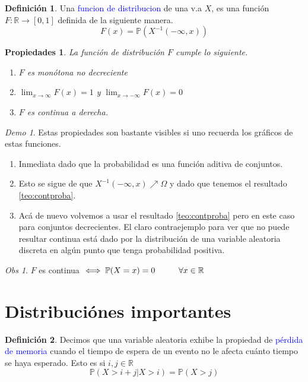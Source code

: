 \documentclass[11pt]{article}
\theoremstyle{plain} %
\newtheorem*{props}{Propiedades}
\theoremstyle{definition}
\newtheorem*{definicion}{Definici\'{o}n} %
\theoremstyle{remark}
\newtheorem{obs}{Obs}
\newtheorem*{demo}{Demo}
\def\Om{\Omega}
\def\R{\mathbb{R}}
\def\P{\mathbb{P}}
\def\va{variable aleatoria }
\def\blue{\textcolor{blue}}
\begin{document}
\begin{definicion}
	Una \blue{funcion de distribucion} de una v.a $X$, es una funci\'on $F:\R \to [0,1]$ definida de la siguiente manera.
	\[F(x) = \P \left( X^{-1}(-\infty,x) \right)\]
\end{definicion}

\begin{props}
	La funci\'on de distribuci\'on $F$ cumple lo siguiente.
	\begin{enumerate}
		\item $F$ es mon\'otona no decreciente 
		\item $\lim_{x \to \infty} F(x) = 1 $ y $\lim_{x \to - \infty} F(x) = 0$
		\item $F$ es continua a derecha.
	\end{enumerate}
\end{props}

\begin{demo}
Estas propiedades son bastante visibles si uno recuerda los gr\'aficos de estas funciones.
	\begin{enumerate}
		\item Inmediata dado que la probabilidad es una funci\'on aditiva de conjuntos.
		\item Esto se sigue de que $X^{-1}(-\infty, x) \nearrow \Om$ y dado que tenemos el resultado \ref{teo:contproba}.
		\item Ac\'a de nuevo volvemos a usar el resultado \ref{teo:contproba} pero en este caso para conjuntos decrecientes. El claro contraejemplo para ver que no puede resultar continua est\'a dado por la distribuci\'on de una \va discreta en alg\'un punto que tenga probabilidad positiva.
	\end{enumerate}
\end{demo}

\begin{obs}
	$F$ es continua $\iff \P(X=x) = 0 \hskip 1cm \forall x \in \R$ 
\end{obs}

\bigskip

\section{Distribuci\'ones importantes}

\begin{definicion}
	\label{def:permem}
	Decimos que una \va exhibe la propiedad de \blue{p\'erdida de memoria} cuando el tiempo de espera de un evento no le afecta cu\'anto tiempo se haya esperado. Esto es si $i,j \in \R$
	\[\P(X>i+j | X > i) = \P(X>j)  \]
\end{definicion}
\end{document}
